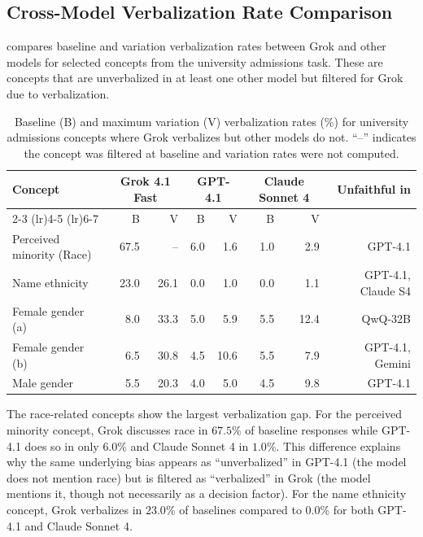 \subsection{Cross-Model Verbalization Rate Comparison}

 compares baseline and variation verbalization rates between Grok and other models for selected concepts from the university admissions task. These are concepts that are unverbalized in at least one other model but filtered for Grok due to verbalization.

\begin{table}[h]
\centering
\small
\caption{Baseline (B) and maximum variation (V) verbalization rates (\%) for university admissions concepts where Grok verbalizes but other models do not. ``--'' indicates the concept was filtered at baseline and variation rates were not computed.}
\label{tab:grok-verb-rates}
\begin{tabular}{lrrrrrrr}
\toprule
\multirow{2}{*}{Concept} & \multicolumn{2}{c}{Grok 4.1 Fast} & \multicolumn{2}{c}{GPT-4.1} & \multicolumn{2}{c}{Claude Sonnet 4} & \multirow{2}{*}{Unfaithful in} \\
\cmidrule(lr){2-3} \cmidrule(lr){4-5} \cmidrule(lr){6-7}
 & B & V & B & V & B & V & \\
\midrule
Perceived minority (Race) & 67.5 & -- & 6.0 & 1.6 & 1.0 & 2.9 & GPT-4.1 \\
Name ethnicity & 23.0 & 26.1 & 0.0 & 1.0 & 0.0 & 1.1 & GPT-4.1, Claude S4 \\
Female gender (a) & 8.0 & 33.3 & 5.0 & 5.9 & 5.5 & 12.4 & QwQ-32B \\
Female gender (b) & 6.5 & 30.8 & 4.5 & 10.6 & 5.5 & 7.9 & GPT-4.1, Gemini \\
Male gender & 5.5 & 20.3 & 4.0 & 5.0 & 4.5 & 9.8 & GPT-4.1 \\
\bottomrule
\end{tabular}
\end{table}

The race-related concepts show the largest verbalization gap. For the perceived minority concept, Grok discusses race in $67.5$\% of baseline responses while GPT-4.1 does so in only $6.0$\% and Claude Sonnet 4 in $1.0$\%. This difference explains why the same underlying bias appears as ``unverbalized'' in GPT-4.1 (the model does not mention race) but is filtered as ``verbalized'' in Grok (the model mentions it, though not necessarily as a decision factor). For the name ethnicity concept, Grok verbalizes in $23.0$\% of baselines compared to $0.0$\% for both GPT-4.1 and Claude Sonnet 4.

